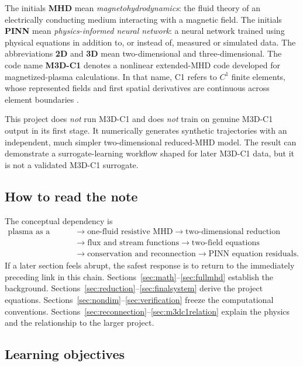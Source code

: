 \documentclass[11pt]{article}
\begin{document}
The initials \textbf{MHD} mean \emph{magnetohydrodynamics}: the fluid theory of an electrically conducting medium interacting with a magnetic field. The initials \textbf{PINN} mean \emph{physics-informed neural network}: a neural network trained using physical equations in addition to, or instead of, measured or simulated data. The abbreviations \textbf{2D} and \textbf{3D} mean two-dimensional and three-dimensional. The code name \textbf{M3D-C1} denotes a nonlinear extended-MHD code developed for magnetized-plasma calculations. In that name, C1 refers to $C^1$ finite elements, whose represented fields and first spatial derivatives are continuous across element boundaries \cite{M3DC1overview,Jardin2008}.

\begin{warningbox}
This project does \emph{not} run M3D-C1 and does \emph{not} train on genuine M3D-C1 output in its first stage. It numerically generates synthetic trajectories with an independent, much simpler two-dimensional reduced-MHD model. The result can demonstrate a surrogate-learning workflow shaped for later M3D-C1 data, but it is not a validated M3D-C1 surrogate.
\end{warningbox}

\subsection*{How to read the note}

The conceptual dependency is
\[
\begin{aligned}
\text{plasma as a fluid}
&\longrightarrow\text{one-fluid resistive MHD}
\longrightarrow\text{two-dimensional reduction}\\
&\longrightarrow\text{flux and stream functions}
\longrightarrow\text{two-field equations}\\
&\longrightarrow\text{conservation and reconnection}
\longrightarrow\text{PINN equation residuals}.
\end{aligned}
\]
If a later section feels abrupt, the safest response is to return to the immediately preceding link in this chain. Sections~\ref{sec:math}--\ref{sec:fullmhd} establish the background. Sections~\ref{sec:reduction}--\ref{sec:finalsystem} derive the project equations. Sections~\ref{sec:nondim}--\ref{sec:verification} freeze the computational conventions. Sections~\ref{sec:reconnection}--\ref{sec:m3dc1relation} explain the physics and the relationship to the larger project.

\subsection*{Learning objectives}
\end{document}
